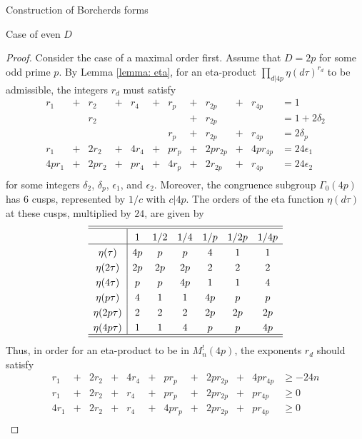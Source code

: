 \documentclass{amsart}
\newcounter{lemma}
\theoremstyle{definition}
\begin{document}
\begin{section}{Construction of Borcherds forms}
\begin{subsection}{Case of even $D$}
\begin{proof}
  Consider the case of a maximal order first. Assume that $D=2p$ for
  some odd prime $p$. By Lemma \ref{lemma: eta}, for an eta-product
  $\prod_{d|4p}\eta(d\tau)^{r_d}$ to be admissible, the integers $r_d$
  must satisfy
  \begin{equation} \label{equation: integer programming 1}
  \begin{array}{rcrcrcrcrcrl}
 r_1& + &r_2& + &r_4& + &r_p& + &r_{2p}& + &r_{4p}&=1 \\
    &   &r_2&   &  &   &   & + &r_{2p} &   &     &=1+2\delta_2 \\
    &   &   &   &  &  & r_p & + &r_{2p}& + &r_{4p}&=2\delta_p \\
 r_1&+&2r_2&+&4r_4&+&pr_p&+&2pr_{2p}&+&4pr_{4p}&=24\epsilon_1 \\
 4pr_1&+&2pr_2&+&pr_4&+&4r_p&+&2r_{2p}&+&r_{4p}&=24\epsilon_2 \\ 
  \end{array}
  \end{equation}
  for some integers $\delta_2$, $\delta_p$, $\epsilon_1$, and $\epsilon_2$.
  Moreover, the congruence subgroup $\Gamma_0(4p)$ has $6$ cusps,
  represented by $1/c$ with $c|4p$. The orders of the eta function
  $\eta(d\tau)$ at these cusps, multiplied by $24$, are given by
  $$ \extrarowheight3pt
  \begin{array}{c|cccccccccc} \hline\hline
  & 1 & 1/2 & 1/4 & 1/p & 1/2p &  1/4p  \\ \hline
  \eta(\tau) & 4p & p & p & 4& 1& 1\\ 
  \eta(2\tau) & 2p & 2p & 2p & 2& 2& 2 \\
  \eta(4\tau)  & p & p & 4p & 1& 1& 4 \\
  \eta(p\tau) & 4 & 1 & 1 & 4p & p & p \\
  \eta(2p\tau)  & 2 & 2 & 2 & 2p & 2p & 2p \\ 
  \eta(4p\tau)  & 1 & 1 & 4 & p & p & 4p \\
  \hline\hline
  \end{array}
  $$
  Thus, in order for an eta-product to be in $M^!_n(4p)$, the
  exponents $r_d$ should satisfy
  \begin{equation} \label{equation: integer programming 2}
  \begin{array}{rcrcrcrcrcrl}
  r_1&+&2r_2&+&4r_4&+&pr_p&+&2pr_{2p}&+&4pr_{4p}&\ge -24n \\
  r_1&+&2r_2&+&r_4&+&pr_p&+&2pr_{2p}&+&pr_{4p}&\ge 0 \\
  4r_1&+&2r_2&+&r_4&+&4pr_p&+&2pr_{2p}&+&pr_{4p}&\ge 0\\

\end{array}
\end{equation}
\end{proof}
\end{subsection}
\end{section}
\end{document}
